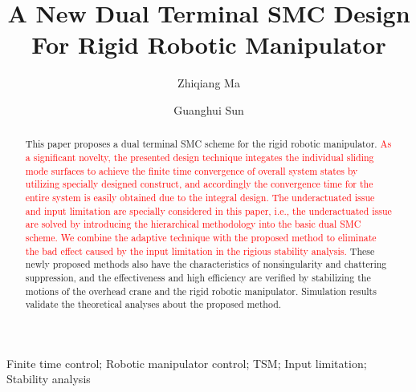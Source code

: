 \documentclass[3p]{elsarticle}
\theoremstyle{plain}
\theoremstyle{remark}
\begin{document}
\begin{frontmatter}
\title{A New Dual Terminal SMC Design For Rigid Robotic Manipulator}
\author{Zhiqiang Ma}
\author{Guanghui Sun}
\address{Research Institute of Intelligent Control and Systems, Harbin Institute of Technology, Harbin 150001, China}

\begin{abstract}
This paper proposes a dual terminal SMC scheme for the rigid robotic manipulator. \textcolor{red}{As a signiﬁcant novelty, the presented design technique integates the individual sliding mode surfaces to achieve the finite time convergence of overall system states by utilizing specially designed construct, and accordingly the convergence time for the entire system is easily obtained due to the integral design. The underactuated issue and input limitation are specially considered in this paper, i.e., the underactuated issue are solved by introducing the hierarchical methodology into the basic dual SMC scheme. We combine the adaptive technique with the proposed method to eliminate the bad effect caused by the input limitation in the rigious stability analysis.} These newly proposed methods also have the characteristics of nonsingularity and chattering suppression, and the effectiveness and high efficiency are verified by stabilizing the motions of the overhead crane and the rigid robotic manipulator. Simulation results validate the theoretical analyses about the proposed method.
\end{abstract}
\begin{keyword}
Finite time control; Robotic manipulator control; TSM; Input limitation; Stability analysis
\end{keyword}
\end{frontmatter}
\end{document}
